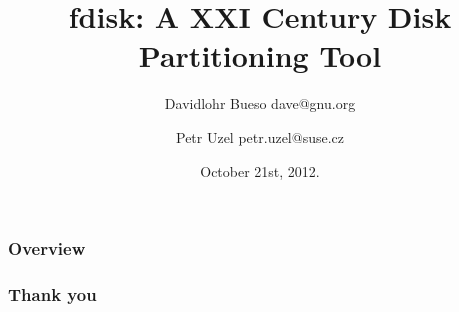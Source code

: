 \documentclass{beamer}
\begin{document}
\title{fdisk: A XXI Century Disk Partitioning Tool}
\author[]{Davidlohr Bueso dave@gnu.org \and Petr Uzel petr.uzel@suse.cz}
\date{October 21st, 2012.}

\begin{frame}
  \titlepage
\end{frame}

\begin{frame}
  \frametitle{Overview}\tableofcontents
\end{frame}







\begin{frame}\frametitle{Thank you}
\end{frame}
\end{document}
